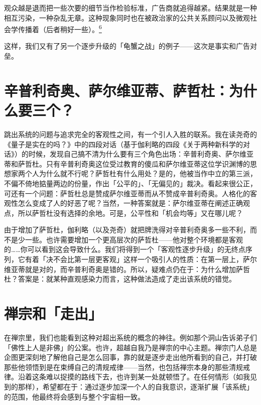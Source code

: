 \documentclass[
  12pt,
  twoside,
  openright,
  oldfontcommands,
]{memoir}
\newenvironment{fsquote}{%
  \begin{mdframed}[style=gebquote]\kaitifamily\small%
}{%
  \end{mdframed}%
}
\begin{document}
\begin{fsquote}
观众越是退而把一些次要的细节当作检验标准，广告商就追得越紧。结果就是一种相互污染，一种杂乱无章。这种现象同时也在被政治家的公共关系顾问以及微观社会学传播着（后者稍好一些）。\hyperref[fn:Chapter15-6]{\textsuperscript{6}}
\end{fsquote}

这样，我们又有了另一个逐步升级的「龟蟹之战」的例子------这次是事实和广告对垒。

\section{辛普利奇奥、萨尔维亚蒂、萨哲杜：为什么要三个？}

跳出系统的问题与追求完全的客观性之间，有一个引人入胜的联系。我在读尧奇的《量子是实在的吗？》中的四段对话（基于伽利略的四段《关于两种新科学的对话》）的时候，发现自己搞不清为什么要有三个角色出场：辛普利奇奥、萨尔维亚蒂和萨哲杜。只有辛普利奇奥这位受过教育的傻瓜和萨尔维亚蒂这位学识渊博的思想家两个人为什么就不行呢？萨哲杜有什么用处？是的，他被当作中立的第三派，不偏不倚地掂量两边的份量，作出「公平的」、「无偏见的」裁决。看起来很公正，可还有一个问题：萨哲杜总是赞成萨尔维亚蒂而从不赞成辛普利奇奥。人格化的客观性怎么变成了人的好恶了呢？当然，一种答案就是：萨尔维亚蒂在阐述正确观点，所以萨哲杜没有选择的余地。可是，公平性和「机会均等」又在哪儿呢？

由于增加了萨哲杜，伽利略（以及尧奇）就把牌洗得对辛普利奇奥多一些不利，而不是少一些。也许需要增加一个更高层次的萨哲杜------他对整个环境都是客观的\ldots\ldots 你可以看到这会导致什么。我们将得到一个「客观性逐步升级」的无终点序列，它有着「决不会比第一层更客观」这样一个吸引人的性质：在第一层上，萨尔维亚蒂就是对的，而辛普利奇奥是错的。所以，疑难点仍在于：为什么增加萨哲杜？答案是：就某种直观感染力而言，这种做法造成了走出该系统的错觉。

\section{禅宗和「走出」}

在禅宗里，我们也能看到这种对超出系统的概念的神往。例如那个洞山告诉弟子们「佛性上人是非佛」的公案。也许，超越自我乃是禅宗的中心主题。禅宗门人总是企图更深刻地了解他自己是怎么回事，靠的就是逐步走出他所看到的自己，并打破那些他领悟到是在束缚自己的清规戒律------当然，也包括禅宗本身的那些清规戒律。沿着这条难以捉摸的路线下去，也许到某一处就顿悟了。在任何情形（如我见到的那样），希望都在于：通过逐步加深一个人的自我意识，逐渐扩展「该系统」的范围，他最终将会感到与整个宇宙相一致。
\end{document}

